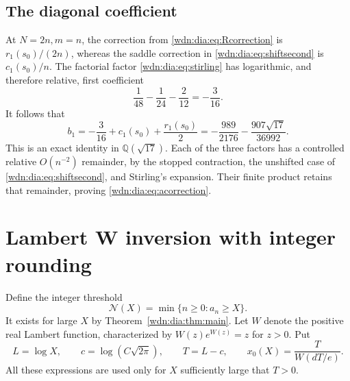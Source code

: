 \documentclass[11pt,letterpaper]{article}
\theoremstyle{remark}\newtheorem{remark}[theorem]{Remark}
\newcommand{\Q}{\mathbb Q}
\begin{document}
\subsection{The diagonal coefficient}
At $N=2n,m=n$, the correction from \eqref{wdn:dia:eq:Rcorrection} is
$r_1(s_0)/(2n)$, whereas the saddle correction in \eqref{wdn:dia:eq:shiftsecond} is
$c_1(s_0)/n$. The factorial factor \eqref{wdn:dia:eq:stirling} has logarithmic,
and therefore relative, first coefficient
\[
 \frac1{48}-\frac1{24}-\frac2{12}=-\frac3{16}.
\]
It follows that
\begin{equation}\label{wdn:dia:eq:b1}
 b_1=-\frac3{16}+c_1(s_0)+\frac{r_1(s_0)}2
 =-\frac{989}{2176}-\frac{907\sqrt{17}}{36992}.
\end{equation}
This is an exact identity in $\Q(\sqrt{17})$. Each of the three factors has
a controlled relative $O(n^{-2})$ remainder, by the stopped contraction,
the unshifted case of \eqref{wdn:dia:eq:shiftsecond}, and Stirling's expansion.
Their finite product retains that remainder, proving \eqref{wdn:dia:eq:acorrection}.

\section{Lambert W inversion with integer rounding}\label{wdn:dia:sec:inverse}
Define the integer threshold
\[
 \mathcal N(X)=\min\{n\ge0:a_n\ge X\}.
\]
It exists for large $X$ by Theorem~\ref{wdn:dia:thm:main}. Let $W$ denote the positive
real Lambert function, characterized by $W(z)e^{W(z)}=z$ for $z>0$. Put
\begin{equation}\label{wdn:dia:eq:inverseparams}
 L=\log X,\qquad c=\log(C\sqrt{2\pi}),\qquad
 T=L-c,\qquad x_0(X)=\frac{T}{W(dT/e)}.
\end{equation}
All these expressions are used only for $X$ sufficiently large that $T>0$.
\end{document}
